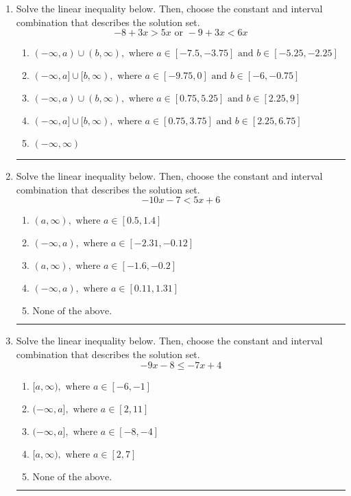 \documentclass[14pt]{extbook}
\newcommand{\litem}[1]{\item#1\hspace*{-1cm}\rule{\textwidth}{0.4pt}}
\begin{document}
\begin{enumerate}
{\begin{enumerate}[label=\Alph*.]
\end{enumerate} }
\litem{
Solve the linear inequality below. Then, choose the constant and interval combination that describes the solution set.\[ -8 + 3 x > 5 x \text{ or } -9 + 3 x < 6 x \]\begin{enumerate}[label=\Alph*.]
\item \( (-\infty, a) \cup (b, \infty), \text{ where } a \in [-7.5, -3.75] \text{ and } b \in [-5.25, -2.25] \)
\item \( (-\infty, a] \cup [b, \infty), \text{ where } a \in [-9.75, 0] \text{ and } b \in [-6, -0.75] \)
\item \( (-\infty, a) \cup (b, \infty), \text{ where } a \in [0.75, 5.25] \text{ and } b \in [2.25, 9] \)
\item \( (-\infty, a] \cup [b, \infty), \text{ where } a \in [0.75, 3.75] \text{ and } b \in [2.25, 6.75] \)
\item \( (-\infty, \infty) \)

\end{enumerate} }
\litem{
Solve the linear inequality below. Then, choose the constant and interval combination that describes the solution set.\[ -10x -7 < 5x + 6 \]\begin{enumerate}[label=\Alph*.]
\item \( (a, \infty), \text{ where } a \in [0.5, 1.4] \)
\item \( (-\infty, a), \text{ where } a \in [-2.31, -0.12] \)
\item \( (a, \infty), \text{ where } a \in [-1.6, -0.2] \)
\item \( (-\infty, a), \text{ where } a \in [0.11, 1.31] \)
\item \( \text{None of the above}. \)

\end{enumerate} }
\litem{
Solve the linear inequality below. Then, choose the constant and interval combination that describes the solution set.\[ -9x -8 \leq -7x + 4 \]\begin{enumerate}[label=\Alph*.]
\item \( [a, \infty), \text{ where } a \in [-6, -1] \)
\item \( (-\infty, a], \text{ where } a \in [2, 11] \)
\item \( (-\infty, a], \text{ where } a \in [-8, -4] \)
\item \( [a, \infty), \text{ where } a \in [2, 7] \)
\item \( \text{None of the above}. \)


\end{enumerate}}
\end{enumerate}
\end{document}
